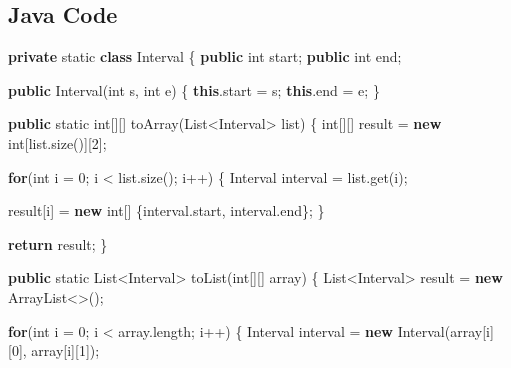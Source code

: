 \documentclass[]{book}
\newenvironment{Shaded}{\begin{snugshade}}{\end{snugshade}}
\newcommand{\BuiltInTok}[1]{#1}
\newcommand{\DataTypeTok}[1]{\textcolor[rgb]{0.13,0.29,0.53}{#1}}
\newcommand{\DecValTok}[1]{\textcolor[rgb]{0.00,0.00,0.81}{#1}}
\newcommand{\FunctionTok}[1]{\textcolor[rgb]{0.00,0.00,0.00}{#1}}
\newcommand{\KeywordTok}[1]{\textcolor[rgb]{0.13,0.29,0.53}{\textbf{#1}}}
\newcommand{\NormalTok}[1]{#1}
\begin{document}
\hypertarget{java-code-19}{%
\subsection{Java Code}\label{java-code-19}}

\begin{Shaded}
\begin{Highlighting}[]
\KeywordTok{private} \DataTypeTok{static} \KeywordTok{class}\NormalTok{ Interval \{}
    \KeywordTok{public} \DataTypeTok{int}\NormalTok{ start;}
    \KeywordTok{public} \DataTypeTok{int}\NormalTok{ end;}

    \KeywordTok{public} \FunctionTok{Interval}\NormalTok{(}\DataTypeTok{int}\NormalTok{ s, }\DataTypeTok{int}\NormalTok{ e) \{}
        \KeywordTok{this}\NormalTok{.}\FunctionTok{start}\NormalTok{ = s;}
        \KeywordTok{this}\NormalTok{.}\FunctionTok{end}\NormalTok{ = e;}
\NormalTok{    \}}

    \KeywordTok{public} \DataTypeTok{static} \DataTypeTok{int}\NormalTok{[][] }\FunctionTok{toArray}\NormalTok{(}\BuiltInTok{List}\NormalTok{<Interval> list) \{}
        \DataTypeTok{int}\NormalTok{[][] result = }\KeywordTok{new} \DataTypeTok{int}\NormalTok{[list.}\FunctionTok{size}\NormalTok{()][}\DecValTok{2}\NormalTok{];}

        \KeywordTok{for}\NormalTok{(}\DataTypeTok{int}\NormalTok{ i = }\DecValTok{0}\NormalTok{; i < list.}\FunctionTok{size}\NormalTok{(); i++) \{}
\NormalTok{            Interval interval = list.}\FunctionTok{get}\NormalTok{(i);}

\NormalTok{            result[i] = }\KeywordTok{new} \DataTypeTok{int}\NormalTok{[] \{interval.}\FunctionTok{start}\NormalTok{, interval.}\FunctionTok{end}\NormalTok{\};}
\NormalTok{        \}}

        \KeywordTok{return}\NormalTok{ result;}
\NormalTok{    \}}

    \KeywordTok{public} \DataTypeTok{static} \BuiltInTok{List}\NormalTok{<Interval> }\FunctionTok{toList}\NormalTok{(}\DataTypeTok{int}\NormalTok{[][] array) \{}
        \BuiltInTok{List}\NormalTok{<Interval> result = }\KeywordTok{new} \BuiltInTok{ArrayList}\NormalTok{<>();}

        \KeywordTok{for}\NormalTok{(}\DataTypeTok{int}\NormalTok{ i = }\DecValTok{0}\NormalTok{; i < array.}\FunctionTok{length}\NormalTok{; i++) \{}
\NormalTok{            Interval interval = }\KeywordTok{new} \FunctionTok{Interval}\NormalTok{(array[i][}\DecValTok{0}\NormalTok{], array[i][}\DecValTok{1}\NormalTok{]);}


\end{Highlighting}
\end{Shaded}
\end{document}
